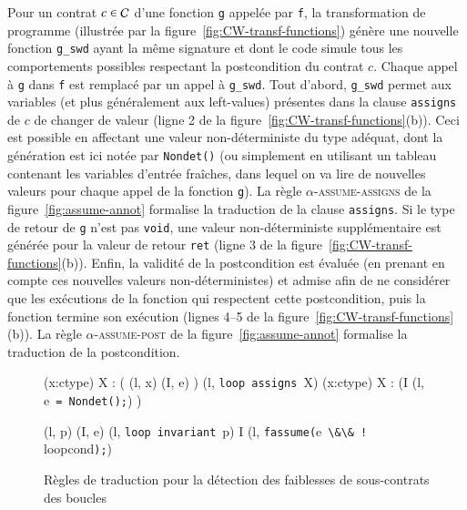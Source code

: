 Pour un contrat $c\in{\ensuremath\mathcal{C}}$ d'une fonction \lstinline'g' appelée par \lstinline'f',
la transformation de programme (illustrée par la
figure~\ref{fig:CW-transf-functions}) génère une nouvelle fonction
\lstinline{g_swd} ayant la même signature et dont le code simule tous les
comportements possibles respectant la postcondition du contrat $c$.
Chaque appel à \lstinline'g' dans \lstinline'f' est remplacé par un appel à
\lstinline{g_swd}.
Tout d'abord, \lstinline{g_swd} permet aux variables (et plus généralement aux
left-values) présentes dans la clause \lstinline'assigns' de $c$ de changer de
valeur (ligne 2 de la figure~\ref{fig:CW-transf-functions}(b)).
Ceci est possible en affectant une valeur non-déterministe du type adéquat,
dont la génération est ici notée par \lstinline{Nondet()} (ou simplement en
utilisant un tableau contenant les variables d'entrée fraîches, dans lequel on
va lire de nouvelles valeurs pour chaque appel de la fonction \lstinline'g').
La règle \textsc{$\alpha$-assume-assigns} de la figure~\ref{fig:assume-annot}
formalise la traduction de la clause \lstinline'assigns'.
Si le type de retour de \lstinline'g' n'est pas \lstinline{void}, une valeur
non-déterministe supplémentaire est générée pour la valeur de retour
\lstinline{ret} (ligne 3 de la figure~\ref{fig:CW-transf-functions}(b)).
Enfin, la validité de la postcondition est évaluée (en prenant en compte ces
nouvelles valeurs non-déterministes) et admise afin de ne considérer que les
exécutions de la fonction qui respectent cette postcondition, puis la fonction
termine son exécution (lignes 4--5 de la
figure~\ref{fig:CW-transf-functions}(b)).
La règle \textsc{$\alpha$-assume-post} de la figure~\ref{fig:assume-annot}
formalise la traduction de la postcondition.

\begin{figure}[tb]
  \scriptsize{
    {
      {
        \forall (x:ctype) \in X :
        (
        (l, x) \trule (I, e)
        )
      }
      {
        (l, \mbox{\lstinline'loop assigns'}~X\semicolon) \arule
        \forall (x:ctype) \in X :
        (I \concat (l,
        e~\mbox{\lstinline'= Nondet();'}) )
      }{}
    }

    {
      {(l, p) \prule (I, e)}
      {
        (l, \mbox{\lstinline'loop invariant'}~p\semicolon) \arule
        I \concat (l, \mbox{\lstinline'fassume('}e~\mbox{\lstinline'\&\& !'}
        loopcond\mbox{\lstinline');'})
      }{}
    }

  }
  \caption{Règles de traduction pour la détection des faiblesses de
    sous-contrats des boucles}
  \label{fig:assume-loop-annot}
\end{figure}

